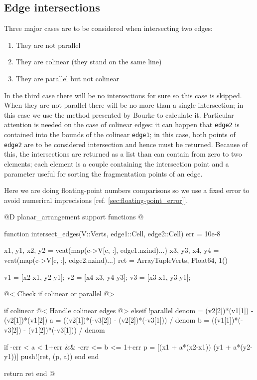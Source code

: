 \subsection{Edge intersections}
\label{sec:intersect_edges}
Three major cases are to be considered when intersecting two edges:
\begin{enumerate}[noitemsep]
    \item They are not parallel
    \item They are colinear (they stand on the same line) 
    \item They are parallel but not colinear
\end{enumerate}
In the third case there will be no intersections for sure so this case is skipped.
When they are not parallel there will be no more than a single intersection; in this case
we use the method presented by Bourke\cite{Bourke} to calculate it.
Particular attention is needed on the case of colinear edges: it can happen
that \texttt{edge2} is contained into the bounds of the colinear \texttt{edge1}; in this case, both points of
\texttt{edge2} are to be considered intersection and hence must be returned. Because of this, 
the intersections are returned as a list than can contain from zero to two elements; 
each element is a couple containing the intersection
point and a parameter useful for sorting the fragmentation points of an edge.

Here we are doing floating-point numbers comparisons so we use a fixed
error to avoid numerical imprecisions [ref. \ref{sec:floating-point_error}].

@D planar\_arrangement support functions
@{function intersect_edges(V::Verts, edge1::Cell, edge2::Cell)
    err = 10e-8

    x1, y1, x2, y2 = vcat(map(c->V[c, :], edge1.nzind)...)
    x3, y3, x4, y4 = vcat(map(c->V[c, :], edge2.nzind)...)
    ret = Array{Tuple{Verts, Float64}, 1}()

    v1 = [x2-x1, y2-y1];
    v2 = [x4-x3, y4-y3];
    v3 = [x3-x1, y3-y1];

    @< Check if colinear or parallel @>

    if colinear
        @< Handle colinear edges @>
    elseif !parallel
        denom = (v2[2])*(v1[1]) - (v2[1])*(v1[2])
        a = ((v2[1])*(-v3[2]) - (v2[2])*(-v3[1])) / denom
        b = ((v1[1])*(-v3[2]) - (v1[2])*(-v3[1])) / denom

        if -err < a < 1+err && -err <= b <= 1+err
            p = [(x1 + a*(x2-x1))  (y1 + a*(y2-y1))]
            push!(ret, (p, a)) 
        end
    end

    return ret
end
@}

